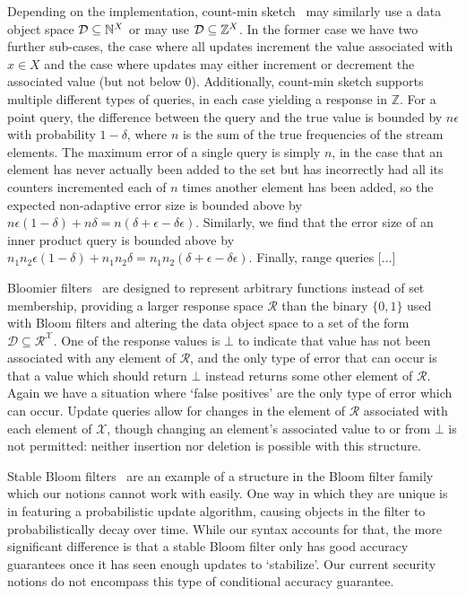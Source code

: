 Depending on the implementation, count-min sketch~\cite{xxx} may similarly use a data object space $\mathcal{D} \subseteq \mathbb{N}^X$ or may use $\mathcal{D} \subseteq \mathbb{Z}^X$. In the former case we have two further sub-cases, the case where all updates increment the value associated with $x \in X$ and the case where updates may either increment or decrement the associated value (but not below 0). Additionally, count-min sketch supports multiple different types of queries, in each case yielding a response in $\mathbb{Z}$. For a point query, the difference between the query and the true value is bounded by $n\epsilon$ with probability $1-\delta$, where $n$ is the sum of the true frequencies of the stream elements. The maximum error of a single query is simply $n$, in the case that an element has never actually been added to the set but has incorrectly had all its counters incremented each of $n$ times another element has been added, so the expected non-adaptive error size is bounded above by $n\epsilon(1-\delta)+n\delta = n(\delta+\epsilon-\delta\epsilon)$.  Similarly, we find that the error size of an inner product query is bounded above by $n_1n_2\epsilon(1-\delta)+n_1n_2\delta = n_1n_2(\delta+\epsilon-\delta\epsilon)$. Finally, range queries [...]

Bloomier filters~\cite{xxx} are designed to represent arbitrary functions instead of set membership, providing a larger response space $\mathcal{R}$ than the binary $\{0,1\}$ used with Bloom filters and altering the data object space to a set of the form $\mathcal{D} \subseteq \mathcal{R}^\mathcal{X}$. One of the response values is $\bot$ to indicate that value has not been associated with any element of $\mathcal{R}$, and the only type of error that can occur is that a value which should return $\bot$ instead returns some other element of $\mathcal{R}$. Again we have a situation where `false positives' are the only type of error which can occur. Update queries allow for changes in the element of $\mathcal{R}$ associated with each element of $\mathcal{X}$, though changing an element's associated value to or from $\bot$ is not permitted: neither insertion nor deletion is possible with this structure.

Stable Bloom filters~\cite{xxx} are an example of a structure in the Bloom filter family which our notions cannot work with easily. One way in which they are unique is in featuring a probabilistic update algorithm, causing objects in the filter to probabilistically decay over time. While our syntax accounts for that, the more significant difference is that a stable Bloom filter only has good accuracy guarantees once it has seen enough updates to `stabilize'. Our current security notions do not encompass this type of conditional accuracy guarantee.

